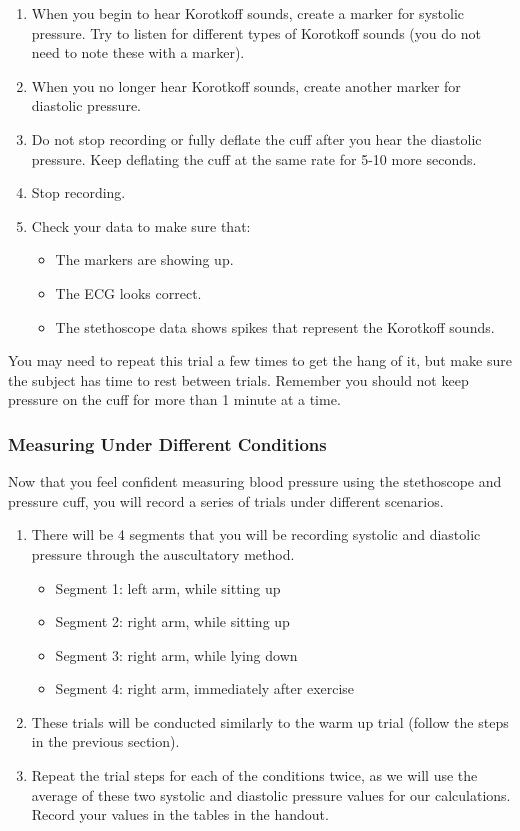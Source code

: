 \documentclass{article}
\begin{document}
\begin{enumerate}
	\item When you begin to hear Korotkoff sounds, create a marker for systolic pressure. Try to listen for different types of Korotkoff sounds (you do not need to note these with a marker).
	\item When you no longer hear Korotkoff sounds, create another marker for diastolic pressure.
	\item Do not stop recording or fully deflate the cuff after you hear the diastolic pressure. Keep deflating the cuff at the same rate for 5-10 more seconds.
	\item Stop recording.
	\item Check your data to make sure that:\begin{itemize}
		\item The markers are showing up.
		\item The ECG looks correct.
		\item The stethoscope data shows spikes that represent the Korotkoff sounds.
	\end{itemize}
\end{enumerate}

You may need to repeat this trial a few times to get the hang of it, but make sure the subject has time to rest between trials. Remember you should not keep pressure on the cuff for more than 1 minute at a time.

\subsubsection*{Measuring Under Different Conditions}
Now that you feel confident measuring blood pressure using the stethoscope and pressure cuff, you will record a series of trials under different scenarios.
\begin{enumerate}
	\item There will be 4 segments that you will be recording systolic and diastolic pressure through the auscultatory method.\begin{itemize}
		\item Segment 1: left arm, while sitting up
		\item Segment 2: right arm, while sitting up
		\item Segment 3: right arm, while lying down
		\item Segment 4: right arm, immediately after exercise
	\end{itemize}
	\item These trials will be conducted similarly to the warm up trial (follow the steps in the previous section).
	\item Repeat the trial steps for each of the conditions twice, as we will use the average of these two systolic and diastolic pressure values for our calculations. Record your values in the tables in the handout.
\end{enumerate}
\end{document}
